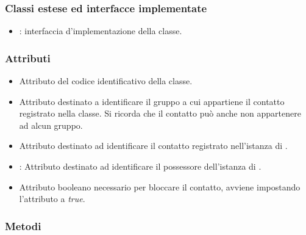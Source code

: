 \subsubsection*{Classi estese ed interfacce implementate}
\begin{itemize}
	\item {}: interfaccia d'implementazione della classe.
\end{itemize}

\subsubsection*{Attributi}

\begin{itemize}
	\item{}
	Attributo del codice identificativo della classe.
	\item{}
	Attributo destinato a identificare il gruppo a cui appartiene il contatto  registrato nella classe. Si ricorda che il contatto può anche non appartenere ad alcun gruppo.
	\item{}
	Attributo destinato ad identificare il contatto registrato nell'istanza di .
	\item{}:
	Attributo destinato ad identificare il possessore dell'istanza di .
	\item{}
	Attributo booleano necessario per bloccare il contatto, avviene impostando l'attributo a \textit{true}.
\end{itemize}


\subsubsection*{Metodi}


